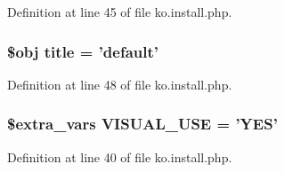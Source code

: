 Definition at line 45 of file ko.\+install.\+php.

\hypertarget{ko_8install_8php_a5b072c5fd1d2228c6ba5cee13cd142e3}{
\subsubsection[{title}]{\setlength{\rightskip}{0pt plus 5cm}\$obj title = 'default'}}\label{ko_8install_8php_a5b072c5fd1d2228c6ba5cee13cd142e3}


Definition at line 48 of file ko.\+install.\+php.

\hypertarget{ko_8install_8php_a7d7de44c97265901bad00952f899d833}{
\subsubsection[{V\+I\+S\+U\+A\+L\+\_\+\+U\+S\+E}]{\setlength{\rightskip}{0pt plus 5cm}\${\bf extra\+\_\+vars} V\+I\+S\+U\+A\+L\+\_\+\+U\+S\+E = 'Y\+E\+S'}}\label{ko_8install_8php_a7d7de44c97265901bad00952f899d833}


Definition at line 40 of file ko.\+install.\+php.


